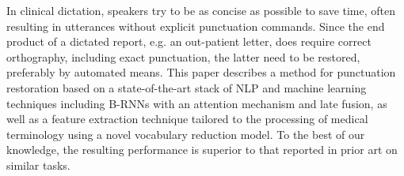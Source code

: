In clinical dictation, speakers try to be as concise as possible to save time, often resulting in utterances without explicit punctuation commands.  Since the end product of a dictated report, e.g. an out-patient letter, does require correct orthography, including exact punctuation, the latter need to be restored, preferably by automated means.  This paper describes a method for punctuation restoration based on a state-of-the-art stack of NLP and machine learning techniques including B-RNNs with an attention mechanism and late fusion, as well as a feature extraction technique tailored to the processing of medical terminology using a novel vocabulary reduction model.  To the best of our knowledge, the resulting performance is superior to that reported in prior art on similar tasks.

